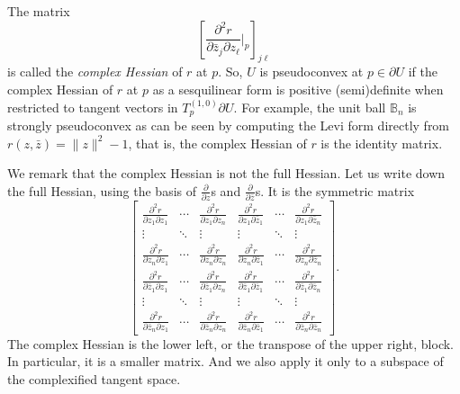 \documentclass[12pt,openany]{book}
\newcommand{\snorm}[1]{\lVert {#1} \rVert}
\newcommand{\bB}{{\mathbb{B}}}
\newcommand{\myindex}[1]{#1\index{#1}}
\theoremstyle{plain}
\theoremstyle{remark}
\theoremstyle{definition}
\theoremstyle{exercise}
\theoremstyle{example}
\begin{document}
The matrix
\begin{equation*}
\left[ \frac{\partial^2 r}{\partial \bar{z}_j \partial z_\ell} \Big|_p
\right]_{j \ell}
\end{equation*}
is called the
\emph{\myindex{complex Hessian}} of $r$ at $p$.
So, $U$ is pseudoconvex at $p \in \partial U$ if
the complex Hessian
of $r$ at $p$ as a sesquilinear form is positive (semi)definite
when restricted to tangent vectors in $T^{(1,0)}_p \partial U$.
For example, the unit ball $\bB_n$ is
strongly pseudoconvex as can be seen by
computing the 
Levi form directly from $r(z,\bar{z}) = \snorm{z}^2-1$, that is,
the complex Hessian of $r$ is the identity matrix.

We remark that the complex Hessian is not the full Hessian.
Let us write down the full Hessian, using the
basis of $\frac{\partial}{\partial z}$s and
$\frac{\partial}{\partial \bar{z}}$s.  It is
the symmetric matrix
\begin{equation*}
\begin{bmatrix}
\frac{\partial^2 r}{\partial z_1 \partial z_1}
& \cdots &
\frac{\partial^2 r}{\partial z_1 \partial z_n}
&
\frac{\partial^2 r}{\partial z_1 \partial \bar{z}_1} 
& \cdots &
\frac{\partial^2 r}{\partial z_1 \partial \bar{z}_n} 
\\
\vdots & \ddots & \vdots & \vdots & \ddots & \vdots
\\
\frac{\partial^2 r}{\partial z_n \partial z_1}
& \cdots &
\frac{\partial^2 r}{\partial z_n \partial z_n}
&
\frac{\partial^2 r}{\partial z_n \partial \bar{z}_1} 
& \cdots &
\frac{\partial^2 r}{\partial z_n \partial \bar{z}_n} 
\\
\frac{\partial^2 r}{\partial \bar{z}_1 \partial z_1}
& \cdots &
\frac{\partial^2 r}{\partial \bar{z}_1 \partial z_n}
&
\frac{\partial^2 r}{\partial \bar{z}_1 \partial \bar{z}_1} 
& \cdots &
\frac{\partial^2 r}{\partial \bar{z}_1 \partial \bar{z}_n} 
\\
\vdots & \ddots & \vdots & \vdots & \ddots & \vdots
\\
\frac{\partial^2 r}{\partial \bar{z}_n \partial z_1}
& \cdots &
\frac{\partial^2 r}{\partial \bar{z}_n \partial z_n}
&
\frac{\partial^2 r}{\partial \bar{z}_n \partial \bar{z}_1} 
& \cdots &
\frac{\partial^2 r}{\partial \bar{z}_n \partial \bar{z}_n} 
\end{bmatrix}
.
\end{equation*}
The complex Hessian is the lower left,
or the transpose of the upper right, block.  In
particular, it is a smaller matrix. And we also apply it only to a subspace 
of the complexified tangent space.
\end{document}
